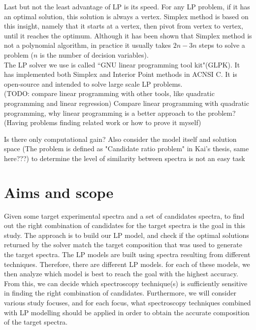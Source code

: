Last but not the least advantage of LP is its speed. For any LP problem, if it has an optimal solution, this solution is always a vertex. Simplex method is based on this insight, namely that it starts at a vertex, then pivot from vertex to vertex, until it reaches the optimum. Although it has been shown that Simplex method is not a polynomial algorithm, in practice it usually takes $2n-3n$ steps to solve a problem ($n$ is the number of decision variables). \\

The LP solver we use is called ``GNU linear programming tool kit"(GLPK). It has implemented both Simplex and Interior Point methods in ACNSI C. It is open-source and intended to solve large scale LP problems. \\


(TODO: compare linear programming with other tools, like quadratic programming and linear regression)
Compare linear programming with quadratic programming, why linear programming is a better approach to the problem? (Having problems finding related work or how to prove it myself)
	
Is there only computational gain?
Also consider the model itself and solution space	
(The problem is defined as "Candidate ratio problem" in Kai's thesis, same here???)
to determine the level of similarity between spectra is not an easy task 
	

	
\section{Aims and scope}
Given some target experimental spectra and a set of candidates spectra, to find out the right combination of candidates for the target spectra is the goal in this study. The approach is to build our LP model, and check if the optimal solutions returned by the solver match the target composition that was used to generate the target spectra. The LP models are built using spectra resulting from different techniques. Therefore, there are different LP models. for each of these models, we then analyze which model is best to reach the goal with the highest accuracy. From this, we can decide which spectroscopy technique(s) is sufficiently sensitive in finding the right combination of candidates. Furthermore, we will consider various study focuses, and for each focus, what spectroscopy techniques combined with LP modelling should be applied in order to obtain the accurate composition of the target spectra. 


